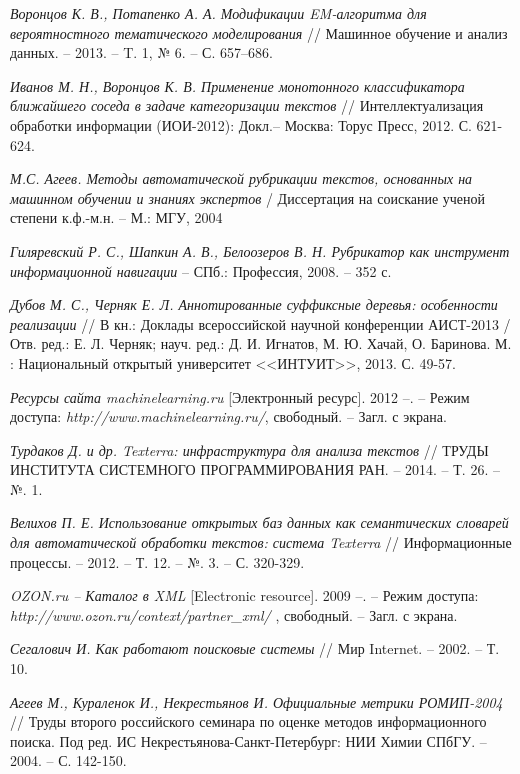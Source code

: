 \documentclass[12pt]{report}
\begin{document}
\begin{thebibliography}{99}
{\it  Воронцов К. В., Потапенко А. А. Модификации EM-алгоритма для вероятностного тематического моделирования } // Машинное обучение и анализ данных. -- 2013. -- T. 1, № 6. -- С. 657–686. 


{\it  Иванов М. Н., Воронцов К. В. Применение монотонного классификатора ближайшего соседа в задаче категоризации текстов} // Интеллектуализация обработки информации (ИОИ-2012): Докл.-- Москва: Торус Пресс, 2012. С. 621-624. 

{\it М.С. Агеев. Методы автоматической рубрикации текстов, основанных на машинном обучении и знаниях экспертов} / Диссертация на соискание ученой степени к.ф.-м.н. -- М.: МГУ, 2004 

{\it Гиляревский Р. С., Шапкин А. В., Белоозеров В. Н. Рубрикатор как инструмент
информационной навигации} -- СПб.: Профессия, 2008. -- 352 с.

{\it Дубов М. С., Черняк Е. Л. Аннотированные суффиксные деревья: особенности реализации} // В кн.: Доклады всероссийской научной конференции АИСТ-2013 / Отв. ред.: Е. Л. Черняк; науч. ред.: Д. И. Игнатов, М. Ю. Хачай, О. Баринова. М. : Национальный открытый университет <<ИНТУИТ>>, 2013. С. 49-57.


{\it  Ресурсы сайта machinelearning.ru } [Электронный ресурс]. 2012 --. -- Режим доступа: {\it
  http://www.machinelearning.ru/}, свободный. -- Загл. с экрана.

{\it Турдаков Д. и др. Texterra: инфраструктура для анализа текстов } // ТРУДЫ ИНСТИТУТА СИСТЕМНОГО ПРОГРАММИРОВАНИЯ РАН. -- 2014. -- Т. 26. -- №. 1.

{\it Велихов П. Е. Использование открытых баз данных как семантических словарей для автоматической обработки текстов: система Texterra} // Информационные процессы. – 2012. – Т. 12. – №. 3. – С. 320-329.

{\it OZON.ru -- Каталог в XML } [Electronic resource]. 2009 --. -- Режим доступа: {\it
   http://www.ozon.ru/context/partner\_xml/ }, свободный. -- Загл. с экрана.

{\it  Сегалович И. Как работают поисковые системы} // Мир Internet. -- 2002. -- Т. 10.  

{\it Агеев М., Кураленок И., Некрестьянов И. Официальные метрики РОМИП-2004 } // Труды второго российского семинара по оценке методов информационного поиска. Под ред. ИС Некрестьянова-Санкт-Петербург: НИИ Химии СПбГУ. -- 2004. -- С. 142-150.


\end{thebibliography}
\end{document}
